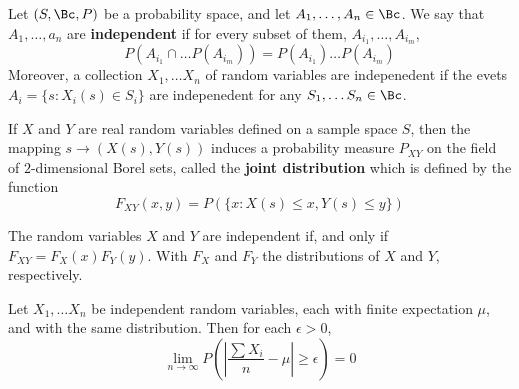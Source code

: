 \begin{definition}
    Let $(S,\Bc, P)$ be a probability space, and let $A_1, \dots, A_n \in \Bc$.
    We say that $A_1, \dots, a_n$ are \textbf{independent} if for every subset
    of them, $A_{i_1}, \dots, A_{i_m}$,
    \begin{equation}
        P(A_{i_1} \cap \dots P(A_{i_m}))=P(A_{i_1}) \dots P(A_{i_m})
    \end{equation}
    Moreover, a collection $X_1, \dots X_n$ of random variables are indepenedent
    if the evets $A_i=\{s : X_i(s) \in S_i\}$ are indepenedent for any $S_1,
    \dots S_n \in \Bc$.
\end{definition}

\begin{definition}
    If $X$ and  $Y$ are real random variables defined on a sample space  $S$,
    then the mapping  $s \rightarrow (X(s), Y(s))$ induces a probability measure
    $P_{XY}$ on the field of $2$-dimensional Borel sets, called the
    \textbf{joint distribution} which is defined by the function
    \begin{equation}
        F_{XY}(x,y)=P(\{x : X(s) \leq x, Y(s) \leq y\})
    \end{equation}
\end{definition}

\begin{lemma}\label{1.1.1}
    The random variables $X$ and  $Y$ are independent if, and only if
    $F_{XY}=F_X(x)F_Y(y)$. With $F_X$ and  $F_Y$ the distributions of  $X$ and
    $Y$, respectively.
\end{lemma}

\begin{theorem}\label{1.1.2}
    Let $X_1, \dots X_n$ be independent random variables, each with finite
    expectation $\mu$, and with the same distribution. Then for each
    $\epsilon>0$,
    \begin{equation}
        \lim_{n \rightarrow \infty}{P(|\frac{\sum{X_i}}{n}-\mu| \geq \epsilon)=0}
    \end{equation}
\end{theorem}
